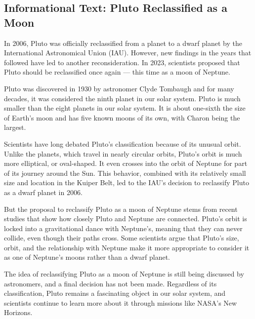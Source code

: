\documentclass[12pt]{article}
\begin{document}
\onehalfspacing

\subsection*{Informational Text: Pluto Reclassified as a Moon}

\begin{tcolorbox}[colframe=black!40, colback=gray!5]

\begin{spacing}{1.15}

In 2006, Pluto was officially reclassified from a planet to a dwarf planet by the International Astronomical Union (IAU). However, new findings in the years that followed have led to another reconsideration. In 2023, scientists proposed that Pluto should be reclassified once again — this time as a moon of Neptune.

Pluto was discovered in 1930 by astronomer Clyde Tombaugh and for many decades, it was considered the ninth planet in our solar system. Pluto is much smaller than the eight planets in our solar system. It is about one-sixth the size of Earth’s moon and has five known moons of its own, with Charon being the largest.

Scientists have long debated Pluto's classification because of its unusual orbit. Unlike the planets, which travel in nearly circular orbits, Pluto’s orbit is much more elliptical, or oval-shaped. It even crosses into the orbit of Neptune for part of its journey around the Sun. This behavior, combined with its relatively small size and location in the Kuiper Belt, led to the IAU's decision to reclassify Pluto as a dwarf planet in 2006.

But the proposal to reclassify Pluto as a moon of Neptune stems from recent studies that show how closely Pluto and Neptune are connected. Pluto’s orbit is locked into a gravitational dance with Neptune’s, meaning that they can never collide, even though their paths cross. Some scientists argue that Pluto's size, orbit, and the relationship with Neptune make it more appropriate to consider it as one of Neptune’s moons rather than a dwarf planet.

The idea of reclassifying Pluto as a moon of Neptune is still being discussed by astronomers, and a final decision has not been made. Regardless of its classification, Pluto remains a fascinating object in our solar system, and scientists continue to learn more about it through missions like NASA's New Horizons.

\end{spacing}

\end{tcolorbox}
\end{document}
